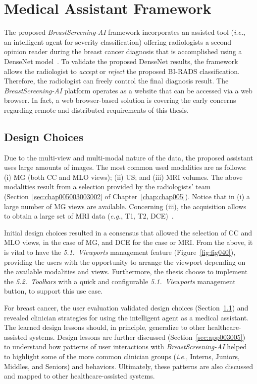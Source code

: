 \section{Medical Assistant Framework}
\label{sec:app003003}

The proposed {\it BreastScreening-AI} framework incorporates an assisted tool ({\it i.e.}, an intelligent agent for severity classification) offering radiologists a second opinion reader during the breast cancer diagnosis that is accomplished  using  a DenseNet model~\cite{chen2019learning}.
To validate the proposed DenseNet results, the framework allows the radiologist to {\it accept} or {\it reject} the proposed \ac{BI-RADS} classification.
Therefore, the radiologist can freely control the final diagnosis result.
The {\it BreastScreening-AI} platform operates as a website that can be accessed via a web browser.
In fact, a web browser-based solution is covering the early concerns regarding remote and distributed requirements of this thesis.

\subsection{Design Choices}
\label{sec:app003003001}

Due to the multi-view and multi-modal nature of the data, the proposed assistant uses large amounts of images.
The most common used modalities are as follows:
(i) \ac{MG} (both \ac{CC} and \ac{MLO} views);
(ii) \ac{US}; and
(iii) \ac{MRI} volumes.
The above modalities result from a selection provided by the radiologists' team (Section~\ref{sec:chap005003003002} of Chapter~\ref{chap:chap005}).
Notice that in (i) a large number of \ac{MG} views are available.
Concerning (iii), the acquisition allows to obtain a large set of \ac{MRI} data ({\it e.g.}, T1, T2, \ac{DCE})~\cite{seifabadi2019correlation}.

Initial design choices resulted in a consensus that allowed the selection of \ac{CC} and \ac{MLO} views, in the case of \ac{MG}, 
and \ac{DCE} for the case or \ac{MRI}.
From the above, it is vital to have the \textit{5.1.~Viewports} management feature (Figure~\ref{fig:fig040}), providing the users with the opportunity to arrange the viewport depending on the available modalities and views.
Furthermore, the thesis choose to implement the \textit{5.2.~Toolbars} with a quick and configurable \textit{5.1.~Viewports} management button, to support this use case.

For breast cancer, the user evaluation validated design choices (Section~\ref{sec:app003003001}) and revealed clinician strategies for using the intelligent agent as a medical assistant.
The learned design lessons should, in principle, generalize to other healthcare-assisted systems.
Design lessons are further discussed (Section~\ref{sec:app003005}) to understand how patterns of user interactions with {\it BreastScreening-AI} helped to highlight some of the more common clinician groups ({\it i.e.}, Interns, Juniors, Middles, and Seniors) and behaviors.
Ultimately, these patterns are also discussed and mapped to other healthcare-assisted systems.

